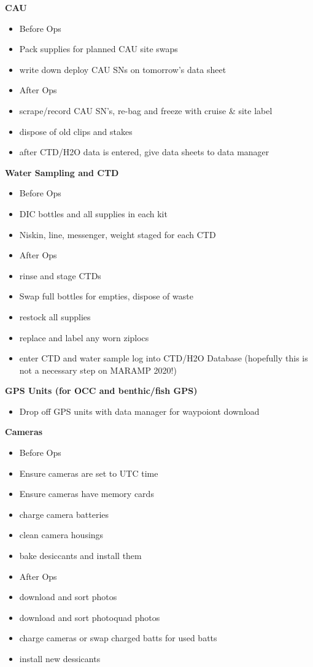 \documentclass[]{book}
\providecommand{\tightlist}{%
  \setlength{\itemsep}{0pt}\setlength{\parskip}{0pt}}
\begin{document}
\textbf{CAU}

\begin{itemize}
\item
  Before Ops
\item
  Pack supplies for planned CAU site swaps
\item
  write down deploy CAU SNs on tomorrow's data sheet
\item
  After Ops
\item
  scrape/record CAU SN's, re-bag and freeze with cruise \& site label
\item
  dispose of old clips and stakes
\item
  after CTD/H2O data is entered, give data sheets to data manager
\end{itemize}

\textbf{Water Sampling and CTD}

\begin{itemize}
\item
  Before Ops
\item
  DIC bottles and all supplies in each kit
\item
  Niskin, line, messenger, weight staged for each CTD
\item
  After Ops
\item
  rinse and stage CTDs
\item
  Swap full bottles for empties, dispose of waste
\item
  restock all supplies
\item
  replace and label any worn ziplocs
\item
  enter CTD and water sample log into CTD/H2O Database (hopefully this
  is not a necessary step on MARAMP 2020!)
\end{itemize}

\textbf{GPS Units (for OCC and benthic/fish GPS)}

\begin{itemize}
\tightlist
\item
  Drop off GPS units with data manager for waypoiont download
\end{itemize}

\textbf{Cameras}

\begin{itemize}
\tightlist
\item
  Before Ops
\item
  Ensure cameras are set to UTC time
\item
  Ensure cameras have memory cards
\item
  charge camera batteries
\item
  clean camera housings
\item
  bake desiccants and install them
\item
  After Ops
\item
  download and sort photos
\item
  download and sort photoquad photos
\item
  charge cameras or swap charged batts for used batts
\item
  install new dessicants
\end{itemize}
\end{document}
